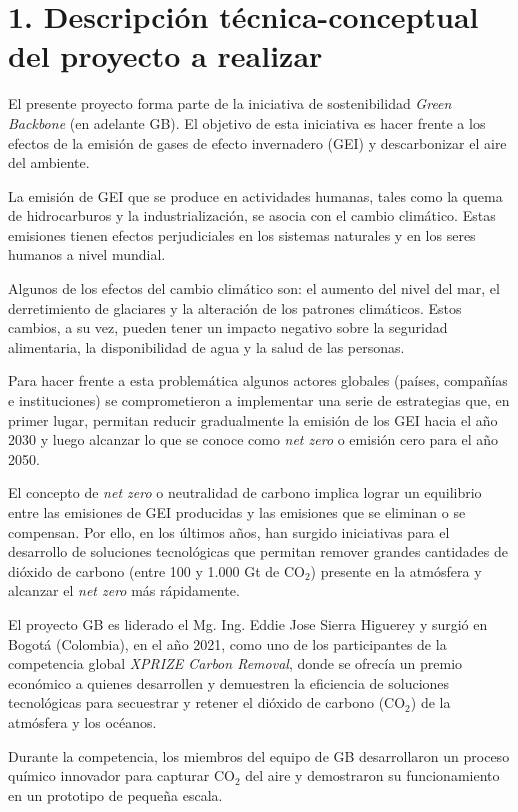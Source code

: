 \documentclass[
11pt, %
]{charter}
\begin{document}
\section{1. Descripción técnica-conceptual del proyecto a realizar}
\label{sec:descripcion}
El presente proyecto forma parte de la iniciativa de sostenibilidad \textit{Green Backbone} (en adelante GB). El objetivo de esta iniciativa es hacer frente a los efectos de la emisión de gases de efecto invernadero (GEI) y descarbonizar el aire del ambiente. 

La emisión de GEI que se produce en actividades humanas, tales como la quema de hidrocarburos y la industrialización, se asocia con el cambio climático. Estas emisiones tienen efectos perjudiciales en los sistemas naturales y en los seres humanos a nivel mundial. 

Algunos de los efectos del cambio climático son: el aumento del nivel del mar, el derretimiento de glaciares y la alteración de los patrones climáticos. Estos cambios, a su vez, pueden tener un impacto negativo sobre la seguridad alimentaria, la disponibilidad de agua y la salud de las personas. 

Para hacer frente a esta problemática algunos actores globales (países, compañías e instituciones) se comprometieron a implementar una serie de estrategias que, en primer lugar, permitan reducir gradualmente la emisión de los GEI hacia el año 2030 y luego alcanzar lo que se conoce como \textit{net zero} o emisión cero para el año 2050. 

El concepto de \textit{net zero} o neutralidad de carbono implica lograr un equilibrio entre las emisiones de GEI producidas y las emisiones que se eliminan o se compensan. Por ello, en los últimos años, han surgido iniciativas para el desarrollo de soluciones tecnológicas que permitan remover grandes cantidades de dióxido de carbono (entre 100 y 1.000 Gt de CO$_2$) presente en la atmósfera y alcanzar el \textit{net zero} más rápidamente.

El proyecto GB es liderado el Mg. Ing. Eddie Jose Sierra Higuerey y surgió en Bogotá (Colombia), en el año 2021, como uno de los participantes de la competencia global \textit{XPRIZE Carbon Removal}, donde se ofrecía un premio económico a quienes desarrollen y demuestren la eficiencia de soluciones tecnológicas para secuestrar y retener el dióxido de carbono (CO$_2$) de la atmósfera y los océanos.

Durante la competencia, los miembros del equipo de GB desarrollaron un proceso químico innovador para capturar CO$_2$ del aire y demostraron su funcionamiento en un prototipo de pequeña escala. 
\end{document}
